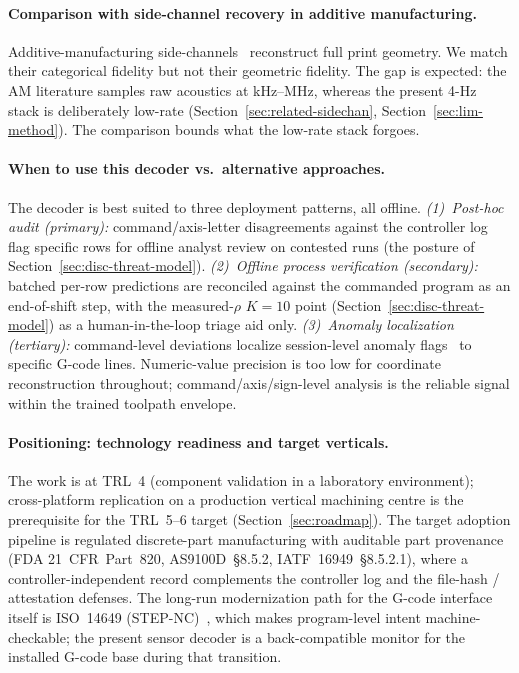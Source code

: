 \documentclass[sensors,article,submit,moreauthors,pdftex]{Definitions/mdpi}
\begin{document}
\paragraph{Comparison with side-channel recovery in additive manufacturing.}\label{sec:disc-comparison-am}\hspace*{0pt plus 1fill}

Additive-manufacturing side-channels~\cite{alfaruque2016acoustic,song2016my,chhetri2016kcad,jamarani2024screg,chattopadhyay2025video} reconstruct full print geometry. We match their categorical fidelity but not their geometric fidelity. The gap is expected: the AM literature samples raw acoustics at kHz--MHz, whereas the present 4-Hz stack is deliberately low-rate (Section~\ref{sec:related-sidechan}, Section~\ref{sec:lim-method}). The comparison bounds what the low-rate stack forgoes.

\paragraph{When to use this decoder vs.\ alternative approaches.}\label{sec:disc-when-to-use} The decoder is best suited to three deployment patterns, all offline. \emph{(1)~Post-hoc audit (primary):} command/axis-letter disagreements against the controller log flag specific rows for offline analyst review on contested runs (the posture of Section~\ref{sec:disc-threat-model}). \emph{(2)~Offline process verification (secondary):} batched per-row predictions are reconciled against the commanded program as an end-of-shift step, with the measured-$\rho$ $K\!=\!10$ point (Section~\ref{sec:disc-threat-model}) as a human-in-the-loop triage aid only. \emph{(3)~Anomaly localization (tertiary):} command-level deviations localize session-level anomaly flags~\cite{coelho2024anomaly,kimmell2025cnc} to specific G-code lines. Numeric-value precision is too low for coordinate reconstruction throughout; command/axis/sign-level analysis is the reliable signal within the trained toolpath envelope.

\paragraph{Positioning: technology readiness and target verticals.} The work is at TRL~4 (component validation in a laboratory environment); cross-platform replication on a production vertical machining centre is the prerequisite for the TRL~5--6 target (Section~\ref{sec:roadmap}). The target adoption pipeline is regulated discrete-part manufacturing with auditable part provenance (FDA 21~CFR~Part~820, AS9100D~\S{}8.5.2, IATF~16949~\S{}8.5.2.1), where a controller-independent record complements the controller log and the file-hash / attestation defenses. The long-run modernization path for the G-code interface itself is ISO~14649 (STEP-NC)~\cite{iso14649}, which makes program-level intent machine-checkable; the present sensor decoder is a back-compatible monitor for the installed G-code base during that transition.
\end{document}
